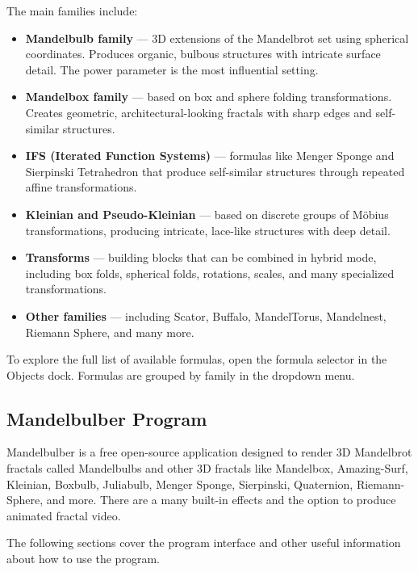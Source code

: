 The main families include:

\begin{itemize}
	\item \textbf{Mandelbulb family} — 3D extensions of the Mandelbrot set using spherical coordinates. Produces organic, bulbous structures with intricate surface detail. The power parameter is the most influential setting.
	\item \textbf{Mandelbox family} — based on box and sphere folding transformations. Creates geometric, architectural-looking fractals with sharp edges and self-similar structures.
	\item \textbf{IFS (Iterated Function Systems)} — formulas like Menger Sponge and Sierpinski Tetrahedron that produce self-similar structures through repeated affine transformations.
	\item \textbf{Kleinian and Pseudo-Kleinian} — based on discrete groups of Möbius transformations, producing intricate, lace-like structures with deep detail.
	\item \textbf{Transforms} — building blocks that can be combined in hybrid mode, including box folds, spherical folds, rotations, scales, and many specialized transformations.
	\item \textbf{Other families} — including Scator, Buffalo, MandelTorus, Mandelnest, Riemann Sphere, and many more.
\end{itemize}

To explore the full list of available formulas, open the formula selector in the Objects dock. Formulas are grouped by family in the dropdown menu.

\subsection{Mandelbulber Program}\label{mandelbulber-program}

Mandelbulber is a free open-source application designed to render 3D
Mandelbrot fractals called Mandelbulbs and other 3D fractals like
Mandelbox, Amazing-Surf, Kleinian, Boxbulb, Juliabulb, Menger Sponge, Sierpinski, Quaternion, Riemann-Sphere, and more. There are a many built-in effects and the option to produce animated fractal video.

The following sections
cover the program interface and other useful information about how to use the program.
